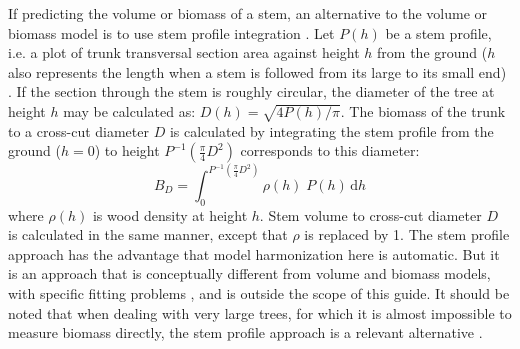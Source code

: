 If predicting the volume or biomass of a stem, an alternative to the volume or biomass model is to use stem profile integration \citep{parresol89,parresol99}. Let $P(h)$ be a stem profile, i.e. a plot of trunk transversal section area against height $h$ from the ground ($h$ also represents the length when a stem is followed from its large to its small end) \citep{maguire96,dean06,metcalf09}. If the section through the stem is roughly circular, the diameter of the tree at height $h$ may be calculated as: $D(h)=\sqrt{4P(h)/\pi}$. The biomass of the trunk to a cross-cut diameter $D$ is calculated by integrating the stem profile from the ground ($h=0$) to height $P^{-1}(\frac{\pi}{4}D^2)$ corresponds to this diameter:
\[
B_D=\int_0^{P^{-1}(\frac{\pi}{4}D^2)}\rho(h)\;P(h)\,\mathrm{d}h
\]
where $\rho(h)$ is wood density at height $h$. Stem volume to cross-cut diameter $D$ is calculated in the same manner, except that $\rho$ is replaced by 1. The stem profile approach has the advantage that model harmonization here is automatic. But it is an approach that is conceptually different from volume and biomass models, with specific fitting problems \citep{fang99,parresol99}, and is outside the scope of this guide. It should be noted that when dealing with very large trees, for which it is almost impossible to measure biomass directly, the stem profile approach is a relevant alternative \citep{vanpelt01,dean03,dean03b,dean06,sillett10}.

